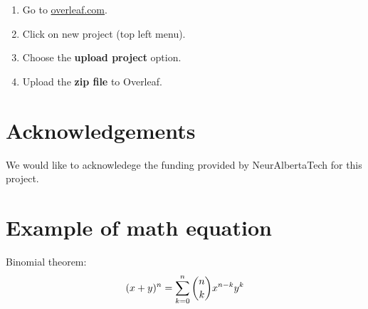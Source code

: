 \documentclass[10pt]{cai}
\begin{document}
\begin{enumerate}
\item Go to \url{overleaf.com}.
\item Click on new project (top left menu).
\item Choose the \textbf{upload project} option.
\item Upload the \textbf{zip file} to Overleaf.
\end{enumerate}

\section*{Acknowledgements}
We would like to acknowledege the funding provided by NeurAlbertaTech for this project.


\appendix

\section{Example of math equation }
Binomial theorem: \cite{hribarUsingDeepQLearning2019}
\begin{equation}
(x+y)^n=\sum_{\substack{k=0}}^{n}\dbinom{n}{k}x^{n-k}y^k
\end{equation}


\printbibliography[heading=subbibintoc]
\end{document}
